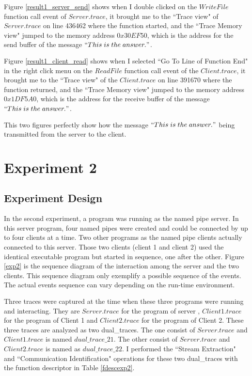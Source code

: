 Figure \ref{result1_server_send} shows when I double clicked on the $WriteFile$ function call event of $Server.trace$, it brought me to the ``Trace view" of $Server.trace$ on line 436462 where the function started, and the ``Trace Memory view" jumped to the memory address $0x30EF50$, which is the address for the send buffer of the message $``This\; is\; the\; answer."$.

Figure \ref{result1_client_read} shows when I selected ``Go To Line of Function End" in the right click menu on the $ReadFile$ function call event of the $Client.trace$, it brought me to the ``Trace view" of the $Client.trace$ on line 391670 where the function returned, and the ``Trace Memory view" jumped to the memory address $0x1DF5A0$, which is the address for the receive buffer of the message $``This\; is\; the\; answer."$.

This two figures perfectly show how the message $``This\; is\; the\; answer."$ being transmitted from the server to the client.

\section{Experiment 2}
\subsection{Experiment Design}
In the second experiment, a program was running as the named pipe server. In this server program, four named pipes were created and could be connected by up to four clients at a time. Two other programs as the named pipe clients actually connected to this server. Those two clients (client 1 and client 2) used the identical executable program but started in sequence, one after the other. Figure \ref{exp2} is the sequence diagram of the interaction among the server and the two clients. This sequence diagram only exemplify a possible sequence of the events. The actual events sequence can vary depending on the run-time environment. 

Three traces were captured at the time when these three programs were running and interacting. They are $Server.trace$ for the program of server , $Client1.trace$ for the program of Client 1 and $Client2.trace$ for the program of Client 2. These three traces are analyzed as two dual\_traces. The one consist of $Server.trace$ and $Client1.trace$ is named $dual\_trace\_21$. The other consist of $Server.trace$ and $Client2.trace$ is named as $dual\_trace\_22$. I performed the ``Stream Extraction" and ``Communication Identification" operations for these two dual\_traces with the function descriptor in Table \ref{fdescexp2}.

